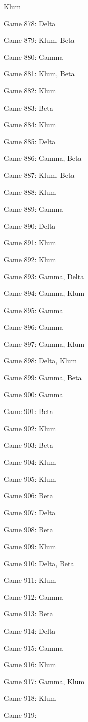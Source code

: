 \documentclass{article}
\begin{document}
\begin{multicols}{3}
\begin{compactitem}
Klum
\item Game 878:
Delta
\item Game 879:
Klum, Beta
\item Game 880:
Gamma
\item Game 881:
Klum, Beta
\item Game 882:
Klum
\item Game 883:
Beta
\item Game 884:
Klum
\item Game 885:
Delta
\item Game 886:
Gamma, Beta
\item Game 887:
Klum, Beta
\item Game 888:
Klum
\item Game 889:
Gamma
\item Game 890:
Delta
\item Game 891:
Klum
\item Game 892:
Klum
\item Game 893:
Gamma, Delta
\item Game 894:
Gamma, Klum
\item Game 895:
Gamma
\item Game 896:
Gamma
\item Game 897:
Gamma, Klum
\item Game 898:
Delta, Klum
\item Game 899:
Gamma, Beta
\item Game 900:
Gamma
\item Game 901:
Beta
\item Game 902:
Klum
\item Game 903:
Beta
\item Game 904:
Klum
\item Game 905:
Klum
\item Game 906:
Beta
\item Game 907:
Delta
\item Game 908:
Beta
\item Game 909:
Klum
\item Game 910:
Delta, Beta
\item Game 911:
Klum
\item Game 912:
Gamma
\item Game 913:
Beta
\item Game 914:
Delta
\item Game 915:
Gamma
\item Game 916:
Klum
\item Game 917:
Gamma, Klum
\item Game 918:
Klum
\item Game 919:

\end{compactitem}
\end{multicols}
\end{document}
